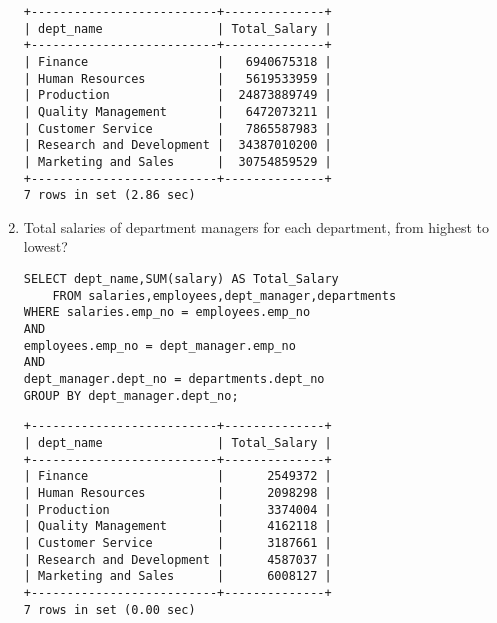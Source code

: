 \documentclass[]{article}
\begin{document}
\begin{enumerate}
\begin{verbatim}
+--------------------------+--------------+
| dept_name                | Total_Salary |
+--------------------------+--------------+
| Finance                  |   6940675318 |
| Human Resources          |   5619533959 |
| Production               |  24873889749 |
| Quality Management       |   6472073211 |
| Customer Service         |   7865587983 |
| Research and Development |  34387010200 |
| Marketing and Sales      |  30754859529 |
+--------------------------+--------------+
7 rows in set (2.86 sec)
\end{verbatim}	

\item Total salaries of department managers for each department, from highest to lowest?

\begin{verbatim}
SELECT dept_name,SUM(salary) AS Total_Salary 
	FROM salaries,employees,dept_manager,departments
WHERE salaries.emp_no = employees.emp_no
AND
employees.emp_no = dept_manager.emp_no
AND
dept_manager.dept_no = departments.dept_no
GROUP BY dept_manager.dept_no;
\end{verbatim}	

\begin{verbatim}
+--------------------------+--------------+
| dept_name                | Total_Salary |
+--------------------------+--------------+
| Finance                  |      2549372 |
| Human Resources          |      2098298 |
| Production               |      3374004 |
| Quality Management       |      4162118 |
| Customer Service         |      3187661 |
| Research and Development |      4587037 |
| Marketing and Sales      |      6008127 |
+--------------------------+--------------+
7 rows in set (0.00 sec)
\end{verbatim}	

\end{enumerate}
\end{document}
